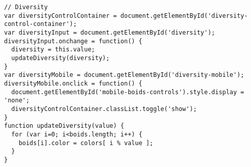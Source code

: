 \begin{lstlisting}
// Diversity
var diversityControlContainer = document.getElementById('diversity-control-container');
var diversityInput = document.getElementById('diversity');
diversityInput.onchange = function() {
  diversity = this.value;
  updateDiversity(diversity);
}
var diversityMobile = document.getElementById('diversity-mobile');
diversityMobile.onclick = function() {
  document.getElementById('mobile-boids-controls').style.display = 'none';
  diversityControlContainer.classList.toggle('show');
}
function updateDiversity(value) {
  for (var i=0; i<boids.length; i++) {
    boids[i].color = colors[ i % value ];
  }
}

\end{lstlisting}


